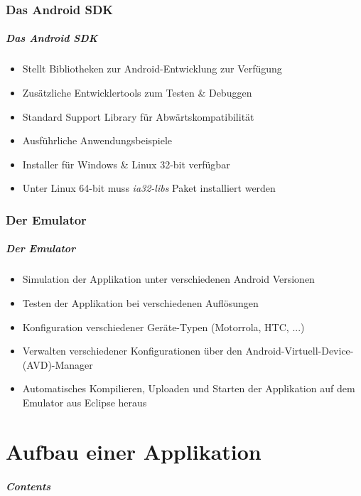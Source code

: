 \section{Das Android SDK}
\begin{frame}[label=eclipse_adt]
   \frametitle{Das Android SDK}
   \begin{itemize}
      \item Stellt Bibliotheken zur Android-Entwicklung zur Verfügung
      \item Zusätzliche Entwicklertools zum Testen \& Debuggen
      \item Standard Support Library für Abwärtskompatibilität
      \item Ausführliche Anwendungsbeispiele
      \item Installer für Windows \& Linux 32-bit verfügbar
      \item Unter Linux 64-bit muss \emph{ia32-libs} Paket installiert werden
   \end{itemize}
\end{frame}

\section{Der Emulator}
\begin{frame}[label=emulator]
   \frametitle{Der Emulator}
   \begin{itemize}
      \item Simulation der Applikation unter verschiedenen Android Versionen
      \item Testen der Applikation bei verschiedenen Auflösungen
      \item Konfiguration verschiedener Geräte-Typen (Motorrola, HTC, ...)
      \item Verwalten verschiedener Konfigurationen über den 
         Android-Virtuell-Device-(AVD)-Manager
      \item Automatisches Kompilieren, Uploaden und Starten der Applikation 
         auf dem Emulator aus Eclipse heraus
   \end{itemize}
\end{frame}

\part{Aufbau einer Applikation}
\frame{\partpage}
\begin{frame}
	\frametitle{Contents}
	\tableofcontents[
		pausesections,
	]
\end{frame}

